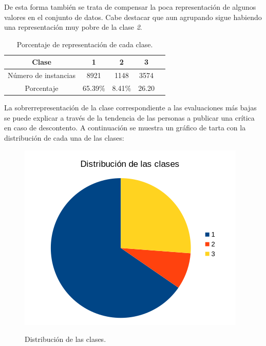 \documentclass[es]{uc3mreport}
\begin{document}
\begin{report}
De esta forma también se trata de compensar la poca representación de algunos valores en el conjunto de datos. Cabe destacar que aun agrupando sigue habiendo una representación muy pobre de la clase \textit{2}.

\begin{table}[H]
    \begin{center}
        \begin{tabular}{@{}ccccc@{}}
            \toprule
            Clase                & 1              & 2      & 3\\
            \midrule
            Número de instancias & 8921           & 1148   & 3574 \\
            Porcentaje           & 65.39\%        & 8.41\% & 26.20\\
            \bottomrule
        \end{tabular}
        \caption{Porcentaje de representación de cada clase.}
    \end{center}
\end{table}

La sobrerrepresentación de la clase correspondiente a las evaluaciones más bajas se puede explicar a través de la tendencia de las personas a publicar una crítica en caso de descontento. A continuación se muestra un gráfico de tarta con la distribución de cada una de las clases:

\begin{figure}[H]
    \center
    \includegraphics[width=0.60\linewidth]{overall_clases.png}\\
    \caption{Distribución de las clases.}
\end{figure}


\end{report}
\end{document}
